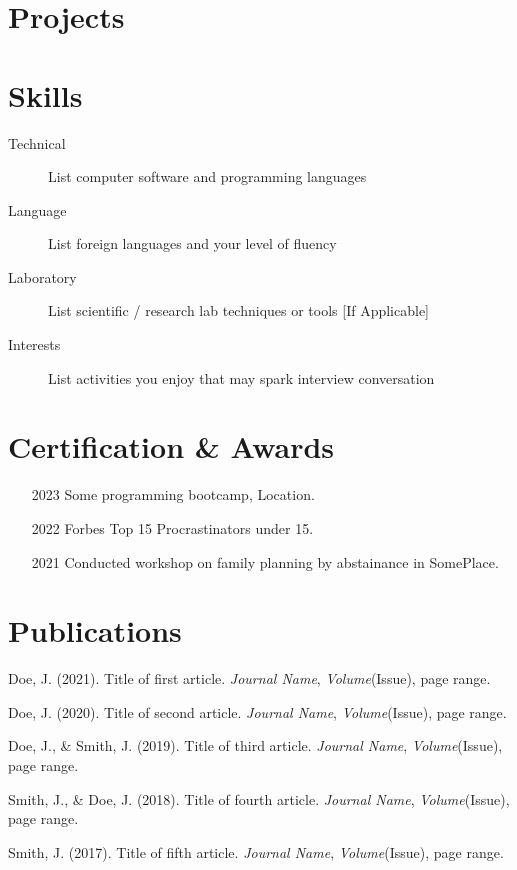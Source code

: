 \documentclass[11pt]{article} %
\begin{document}
\section{Projects}


\section{Skills}
\begin{description}
    \item[Technical] List computer software and programming languages 
    \item[Language] List foreign languages and your level of fluency
    \item[Laboratory] List scientific / research lab techniques or tools [If Applicable]
    \item[Interests] List activities you enjoy that may spark interview conversation
\end{description}


\section{Certification \& Awards}
\begin{enumerate}[font=\bfseries, align=left]
    \item [2023] Some programming bootcamp, Location.
    \item [2022] Forbes Top 15 Procrastinators under 15.
    \item [2021] Conducted workshop on family planning by abstainance in SomePlace.
\end{enumerate}


\section{Publications}
\begin{enumerate}[left=0pt..1.5em, label={[\texttt{\arabic*}]}]
    \item Doe, J. (2021). Title of first article. \emph{Journal Name}, \emph{Volume}(Issue), page range.
    \item Doe, J. (2020). Title of second article. \emph{Journal Name}, \emph{Volume}(Issue), page range.
    \item Doe, J., \& Smith, J. (2019). Title of third article. \emph{Journal Name}, \emph{Volume}(Issue), page range.
    \item Smith, J., \& Doe, J. (2018). Title of fourth article. \emph{Journal Name}, \emph{Volume}(Issue), page range.
    \item Smith, J. (2017). Title of fifth article. \emph{Journal Name}, \emph{Volume}(Issue), page range.
\end{enumerate}
\end{document}
